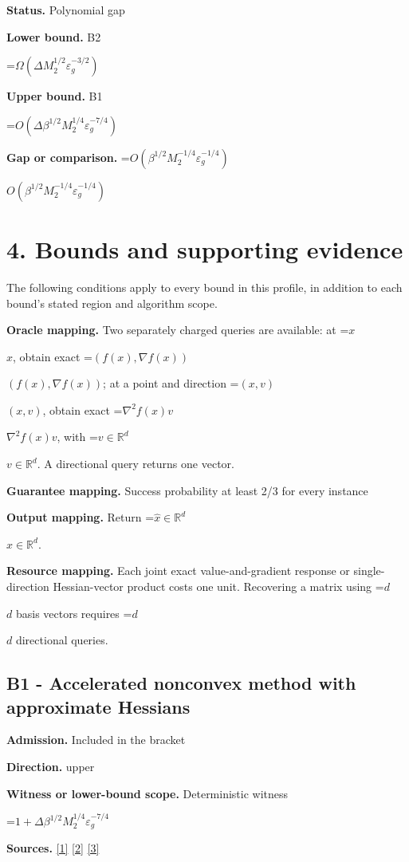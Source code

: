 \documentclass[10pt,a4paper]{article}
\newcommand{\AtlasMath}[1]{\par\begingroup\centering\setbox0=\hbox{$\displaystyle #1$}\ifdim\wd0>1.4\linewidth\typeout{ATLAS WIDE FORMULA: \the\wd0}\fi\ifdim\wd0>\linewidth\resizebox{\linewidth}{!}{\box0}\else\box0\fi\par\endgroup}
\newcommand{\AtlasInlineMath}[1]{\begingroup\setbox0=\hbox{$#1$}\ifdim\wd0>.4\linewidth\endgroup\AtlasMath{#1}\else\endgroup$#1$\fi}
\begin{document}
\textbf{Status.} Polynomial gap

\textbf{Lower bound.} B2

\AtlasMath{\Omega(\Delta M_2^{1/2}\varepsilon_g^{-3/2})}
\textbf{Upper bound.} B1

\AtlasMath{O(\Delta\beta^{1/2}M_2^{1/4}\varepsilon_g^{-7/4})}
\textbf{Gap or comparison.} \AtlasInlineMath{O(\beta^{1/2}M_2^{-1/4}\varepsilon_g^{-1/4})}

\section{4. Bounds and supporting evidence}
The following conditions apply to every bound in this profile, in addition to each bound's stated region and algorithm scope.

\textbf{Oracle mapping.} Two separately charged queries are available: at \AtlasInlineMath{x}, obtain exact \AtlasInlineMath{(f(x),\nabla f(x))}; at a point and direction \AtlasInlineMath{(x,v)}, obtain exact \AtlasInlineMath{\nabla^2f(x)v}, with \AtlasInlineMath{v\in\mathbb{R}^d}. A directional query returns one vector.

\textbf{Guarantee mapping.} Success probability at least 2/3 for every instance

\textbf{Output mapping.} Return \AtlasInlineMath{\widehat{x}\in \mathbb{R}^d}.

\textbf{Resource mapping.} Each joint exact value-and-gradient response or single-direction Hessian-vector product costs one unit. Recovering a matrix using \AtlasInlineMath{d} basis vectors requires \AtlasInlineMath{d} directional queries.

\subsection{B1 - Accelerated nonconvex method with approximate Hessians}
\textbf{Admission.} Included in the bracket

\textbf{Direction.} upper

\textbf{Witness or lower-bound scope.} Deterministic witness

\AtlasMath{1+\Delta\beta^{1/2}M_2^{1/4}\varepsilon_g^{-7/4}}
\textbf{Sources.} \href{https://proceedings.nips.cc/paper_files/paper/2025/file/3dc910c921507a5d51d3dac0202b2618-Paper-Conference.pdf}{[1]} \href{https://arxiv.org/abs/1710.11606v3}{[2]} \href{https://optimization-online.org/wp-content/uploads/2015/06/4970.pdf}{[3]}
\end{document}
